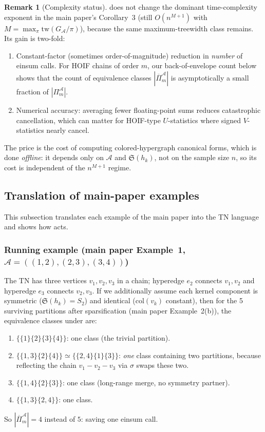 \documentclass[11pt]{article}
\newcommand{\calA}{\mathcal{A}}
\newcommand{\tw}{\mathrm{tw}}
\newcommand{\Sym}{\mathfrak{S}}
\theoremstyle{plain}
\theoremstyle{definition}
\newtheorem{remark}[theorem]{Remark}
\begin{document}
\begin{remark}[Complexity status]
 does not change the dominant time-complexity exponent in
the main paper's Corollary~3 (still $O(n^{M+1})$ with
$M=\max_\pi \tw(G_\calA/\pi)$), because the same maximum-treewidth class
remains.  Its gain is two-fold:
\begin{enumerate}[label=(\roman*),leftmargin=2em]
\item Constant-factor (sometimes order-of-magnitude) reduction in
\emph{number} of einsum calls.  For HOIF chains of order $m$, our
back-of-envelope count below shows that the count of equivalence classes
$|\overline{\Pi}_m^\calA|$ is asymptotically a small fraction of
$|\Pi_m^\calA|$.
\item Numerical accuracy: averaging fewer floating-point sums reduces
catastrophic cancellation, which can matter for HOIF-type
$U$-statistics where signed $V$-statistics nearly cancel.
\end{enumerate}
The price is the cost of computing colored-hypergraph canonical forms, which
is done \emph{offline}: it depends only on $\calA$ and $\Sym(h_k)$, not on
the sample size $n$, so its cost is independent of the $n^{M+1}$ regime.
\end{remark}

\subsection{Translation of main-paper examples}

This subsection translates each example of the main paper into the TN
language and shows how  acts.

\subsubsection*{Running example (main paper Example~1, $\calA=((1,2),(2,3),(3,4))$)}

The TN has three vertices $v_1,v_2,v_3$ in a chain; hyperedge $e_2$ connects
$v_1,v_2$ and hyperedge $e_3$ connects $v_2,v_3$.  If we additionally assume
each kernel component is symmetric ($\Sym(h_k)=S_2$) and identical
($\mathrm{col}(v_k)$ constant), then for the 5 surviving partitions after
sparsification (main paper Example~2(b)), the equivalence classes under
 are:
\begin{enumerate}[leftmargin=2em]
\item $\{\{1\}\{2\}\{3\}\{4\}\}$: one class (the trivial partition).
\item $\{\{1,3\}\{2\}\{4\}\}\simeq \{\{2,4\}\{1\}\{3\}\}$: \emph{one}
class containing two partitions, because reflecting the chain
$v_1{-}v_2{-}v_3$ via $\sigma$ swaps these two.
\item $\{\{1,4\}\{2\}\{3\}\}$: one class (long-range merge, no symmetry partner).
\item $\{\{1,3\}\{2,4\}\}$: one class.
\end{enumerate}
So $|\overline{\Pi}_m^\calA|=4$ instead of $5$: saving one einsum call.
\end{document}
